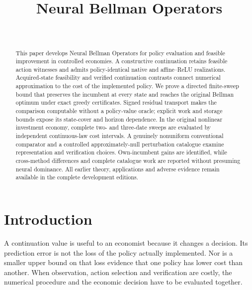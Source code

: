 \documentclass[ecta,nameyear,draft]{econsocart}
\begin{document}
\begin{frontmatter}
\title{Neural Bellman Operators}
\begin{aug}
\author[id=au1,addressref={add1}]{~}
\address[id=add1]{Peking University}
\end{aug}
\begin{abstract}
This paper develops Neural Bellman Operators for policy evaluation and feasible improvement in controlled economies. A constructive continuation retains feasible action witnesses and admits policy-identical native and affine--ReLU realizations. Acquired-state feasibility and verified continuation contrasts connect numerical approximation to the cost of the implemented policy. We prove a directed finite-sweep bound that preserves the incumbent at every state and reaches the original Bellman optimum under exact greedy certificates. Signed residual transport makes the comparison computable without a policy-value oracle; explicit work and storage bounds expose its state-cover and horizon dependence. In the original nonlinear investment economy, complete two- and three-date sweeps are evaluated by independent continuous-law cost intervals. A genuinely nonuniform conventional comparator and a controlled approximately-null perturbation catalogue examine representation and verification choices. Own-incumbent gains are identified, while cross-method differences and complete catalogue work are reported without presuming neural dominance. All earlier theory, applications and adverse evidence remain available in the complete development editions.
\end{abstract}
\begin{keyword}
\end{keyword}
\end{frontmatter}
\section{Introduction}\label{sec:introduction49}
A continuation value is useful to an economist because it changes a decision. Its prediction error is not the loss of the policy actually implemented. Nor is a smaller upper bound on that loss evidence that one policy has lower cost than another. When observation, action selection and verification are costly, the numerical procedure and the economic decision have to be evaluated together.
\end{document}

